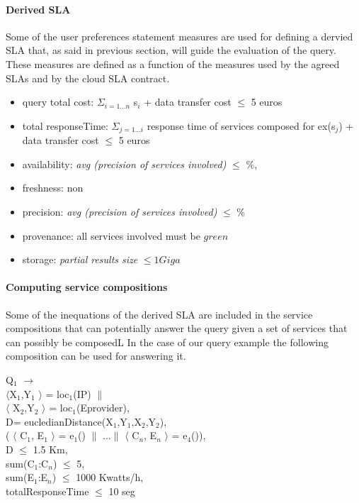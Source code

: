  \paragraph{Derived SLA} 
 Some of the user preferences statement measures are used for defining a dervied SLA that, as said in previous section, will guide the evaluation of the query. These measures are defined as a function of the measures used by the agreed SLAs and by the cloud SLA contract.
 \begin{itemize}
\sf\footnotesize
 \item  query total cost: $\Sigma_{i = 1 ... n}$ s$_i$ + data transfer cost $\leq$ 5 euros
 \item  total responseTime: $\Sigma_{j = 1 ... i}$ response time of services composed for ex(s$_j$) + data transfer cost $\leq$ 5 euros
 \item availability: {\em avg (precision of services involved)} $\leq$ {$\%$}, 
 \item freshness: non 
 \item precision: {\em avg (precision of services involved)} $\leq$ {$\%$}
 \item provenance:  all services involved must be $green$
 \item storage: {\em partial results size} $\leq 1 Giga$ 
 \end{itemize} 
 
  \paragraph{Computing service compositions} 
  Some of the inequations of the derived SLA are included in the service compositions that can potentially answer the query given a set of services that can possibly be composedL In the case of our query example the following composition can be used for answering it.
  \begin{description}
\sf\footnotesize
\item Q$_1$ $\rightarrow$  \\$\langle$X$_1$,Y$_1$ $\rangle$ = loc$_1$(IP) $\parallel$  \\$\langle$ X$_2$,Y$_2$ $\rangle$ = loc$_1$(Eprovider), \\D= eucledianDistance(X$_1$,Y$_1$,X$_2$,Y$_2$), \\(
$\langle$ C$_1$, E$_1$ $\rangle$ = e$_1$() $\parallel$ ...$\parallel$ $\langle$ C$_n$, E$_n$ $\rangle$ = e$_4$()), \\D $\leq$ 1.5 Km,\\ sum(C$_1$:C$_n$) $\leq$ 5, \\ sum(E$_1$:E$_n$) $\leq$ 1000 Kwatts/h, \\ totalResponseTime  $\leq$ 10 seg
  \end{description}
  
